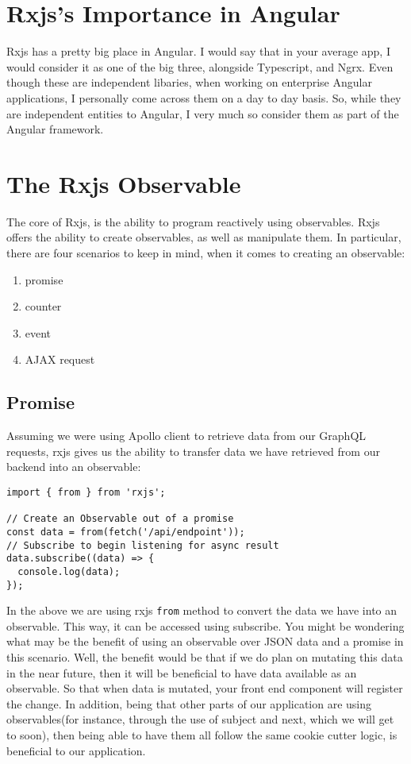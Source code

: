 \section{ Rxjs's Importance in Angular }
Rxjs has a pretty big place in Angular. I would say that in your average app, 
I would consider it as one of the big three, alongside Typescript, and Ngrx. 
Even though these are independent libaries, when working on enterprise Angular
applications, I personally come across them on a day to day basis. So, while 
they are independent entities to Angular, I very much so consider them as part 
of the Angular framework. 

\section{ The Rxjs Observable }
The core of Rxjs, is the ability to program reactively using observables. Rxjs 
offers the ability to create observables, as well as manipulate them. In 
particular, there are four scenarios to keep in mind, when it comes to creating
an observable: 
\begin{enumerate}
  \item promise
  \item counter
  \item event
  \item AJAX request
\end{enumerate}

\subsection{ Promise }
Assuming we were using Apollo client to retrieve data from our GraphQL 
requests, rxjs gives us the ability to transfer data we have retrieved from our
backend into an observable: 
\begin{lstlisting}
import { from } from 'rxjs';

// Create an Observable out of a promise
const data = from(fetch('/api/endpoint'));
// Subscribe to begin listening for async result
data.subscribe((data) => {
  console.log(data);
});  
\end{lstlisting}

In the above we are using rxjs \lstinline{from} method to convert the data we
have into an observable. This way, it can be accessed using subscribe. You 
might be wondering what may be the benefit of using an observable over JSON 
data and a promise in this scenario. Well, the benefit would be that if we do 
plan on mutating this data in the near future, then it will be beneficial to 
have data available as an observable. So that when data is mutated, your 
front end component will register the change. In addition, being that other parts 
of our application are using observables(for instance, through the use of 
subject and next, which we will get to soon), then being able to have them all
follow the same cookie cutter logic, is beneficial to our application. 

